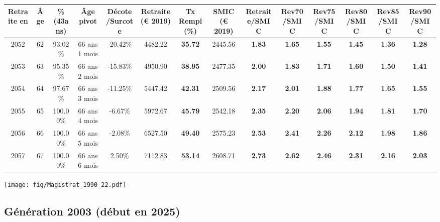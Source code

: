 \begin{adjustbox}{max width=\textwidth} 
\begin{tabular}[htb]{|c|c||c|c|c||c|c||c||c|c|c|c|c|c|} 
\hline 
 Retraite en &  Âge &  \%(43ans) &  Âge pivot &  Décote/Surcote &  Retraite (\euro{} 2019) &  Tx Rempl(\%) &  SMIC (\euro{} 2019) &  Retraite/SMIC &  Rev70/SMIC &  Rev75/SMIC &  Rev80/SMIC &  Rev85/SMIC &  Rev90/SMIC \\ 
\hline \hline 
 2052 &  62 &  93.02\% &  66 ans 1 mois &  -20.42\% &  4482.22 &  {\bf 35.72} &  2445.56 &  {\bf 1.83} &  {\bf 1.65} &  {\bf 1.55} &  {\bf 1.45} &  {\bf 1.36} &  {\bf 1.28} \\ 
\hline 
 2053 &  63 &  95.35\% &  66 ans 2 mois &  -15.83\% &  4950.90 &  {\bf 38.95} &  2477.35 &  {\bf 2.00} &  {\bf 1.83} &  {\bf 1.71} &  {\bf 1.60} &  {\bf 1.50} &  {\bf 1.41} \\ 
\hline 
 2054 &  64 &  97.67\% &  66 ans 3 mois &  -11.25\% &  5447.42 &  {\bf 42.31} &  2509.56 &  {\bf 2.17} &  {\bf 2.01} &  {\bf 1.88} &  {\bf 1.77} &  {\bf 1.65} &  {\bf 1.55} \\ 
\hline 
 2055 &  65 &  100.00\% &  66 ans 4 mois &  -6.67\% &  5972.67 &  {\bf 45.79} &  2542.18 &  {\bf 2.35} &  {\bf 2.20} &  {\bf 2.06} &  {\bf 1.94} &  {\bf 1.81} &  {\bf 1.70} \\ 
\hline 
 2056 &  66 &  100.00\% &  66 ans 5 mois &  -2.08\% &  6527.50 &  {\bf 49.40} &  2575.23 &  {\bf 2.53} &  {\bf 2.41} &  {\bf 2.26} &  {\bf 2.12} &  {\bf 1.98} &  {\bf 1.86} \\ 
\hline 
 2057 &  67 &  100.00\% &  66 ans 6 mois &  2.50\% &  7112.83 &  {\bf 53.14} &  2608.71 &  {\bf 2.73} &  {\bf 2.62} &  {\bf 2.46} &  {\bf 2.31} &  {\bf 2.16} &  {\bf 2.03} \\ 
\hline 
\hline 
\end{tabular} 
\end{adjustbox} 
 
 \vspace{0.1cm} 

 \begin{center}\texttt{[image: fig/Magistrat\_1990\_22.pdf]}\end{center} \label{fig/Magistrat_1990_22.pdf} 

\newpage 
 
\subsection{Génération 2003 (début en 2025)} 

